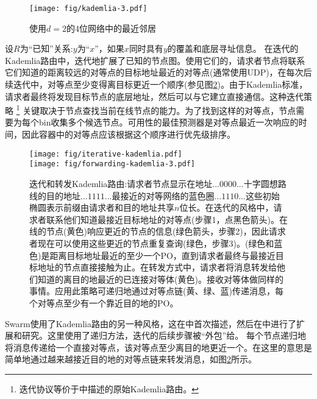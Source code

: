 \begin{figure}[htbp]
   \centering
    \texttt{[image: fig/kademlia-3.pdf]}
   \caption[最近的邻居\statusgreen]{使用$d = 2$的4位网络中的最近邻居 }
   \label{fig:bin-density}
\end{figure}

设$R$为“已知”关系:$y$为“$x$”，如果$x$同时具有$y$的覆盖和底层寻址信息。
在迭代的Kademlia路由中，迭代地扩展了已知的节点图。使用它们的，请求者节点将联系它们知道的距离较远的对等点的目标地址最近的对等点(通常使用UDP)，在每次后续迭代中，对等点至少变得离目标更近一个顺序(参见图\ref{fig:iterative-forwarding-kademlia})。由于Kademlia标准，请求者最终将发现目标节点的底层地址，然后可以与它建立直接通信。这种迭代策略%
%
\footnote{迭代协议等价于\cite{maymounkov2002kademlia}中描述的原始Kademlia路由。
}
%
关键取决于节点查找当前在线节点的能力。为了找到这样的对等点，节点需要为每个bin收集多个候选节点。可用性的最佳预测器是对等点最近一次响应的时间，因此容器中的对等点应该根据这个顺序进行优先级排序。

\begin{figure}[htbp]
   \centering
   \vspace{-2cm} 
   \texttt{[image: fig/iterative-kademlia.pdf]} \\\vspace{-1.3cm}
   \texttt{[image: fig/forwarding-kademlia-3.pdf]}
   \caption[迭代和转发Kademlia路由\statusgreen]{迭代和转发Kademlia路由:请求者节点显示在地址$...0000...$十字圆想路线的目的地址$...1111...$最接近的对等网络的蓝色圈$...1110...$这些初始椭圆表示前缀由请求者和目的地址共享$n$位长。在迭代的风格中，请求者联系他们知道最接近目标地址的对等点(步骤1，点黑色箭头)。在线的节点(黄色)响应更近的节点的信息(绿色箭头，步骤2)，因此请求者现在可以使用这些更近的节点重复查询(绿色，步骤3)。(绿色和蓝色)是距离目标地址最近的至少一个PO，直到请求者最终与最接近目标地址的节点直接接触为止。在转发方式中，请求者将消息转发给他们知道的离目的地最近的已连接对等体(黄色)。接收对等体做同样的事情。应用此策略可递归地通过对等点链(黄、绿、蓝)传递消息，每个对等点至少有一个靠近目的地的PO。}
   \label{fig:iterative-forwarding-kademlia}
\end{figure}


Swarm使用了Kademlia路由的另一种风格，这在\cite{heep2010r}中首次描述，然后在\cite{tronetal2019-network}中进行了扩展和研究。这里使用了递归方法，迭代的后续步骤被“外包”给。
每个节点递归地将消息传递给一个直接对等点，该对等点至少离目的地更近一个。在这里的意思是简单地通过越来越接近目的地的对等点链来转发消息，如图\ref{fig:iterative-forwarding-kademlia}所示。



